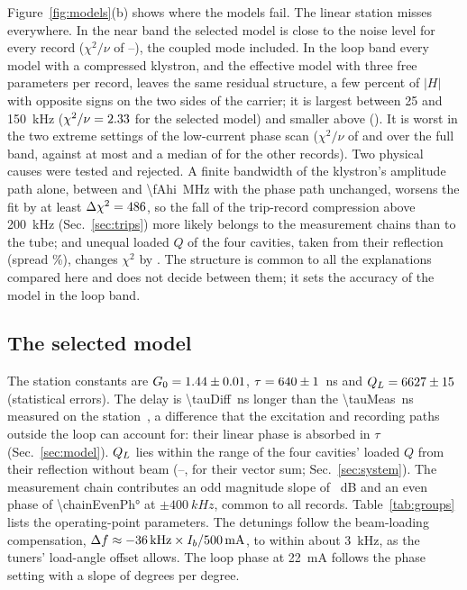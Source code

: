 Figure~\ref{fig:models}(b) shows where the models fail. The linear station misses everywhere. In the near band the selected model is close to the noise level for every record ($\chi^2/\nu$ of \chiRecNearLo--\chiRecNearHi), the coupled mode included. In the loop band every model with a compressed klystron, and the effective model with three free parameters per record, leaves the same residual structure, a few percent of $|H|$ with opposite signs on the two sides of the carrier; it is largest between 25 and \SI{150}{kHz} ($\chi^2/\nu=2.33$ for the selected model) and smaller above (\chiSelLoopHigh). It is worst in the two extreme settings of the low-current phase scan ($\chi^2/\nu$ of \chiRecLowLo{} and \chiRecLowHi{} over the full band, against at most \chiRecOthersHi{} and a median of \chiRecOthersMedian{} for the other records). Two physical causes were tested and rejected. A finite bandwidth of the klystron's amplitude path alone, between \fAlo{} and \SI{\fAhi}{MHz} with the phase path unchanged, worsens the fit by at least $\Delta\chi^2=486$, so the fall of the trip-record compression above \SI{200}{kHz} (Sec.~\ref{sec:trips}) more likely belongs to the measurement chains than to the tube; and unequal loaded $Q$ of the four cavities, taken from their reflection (spread \qSpread\%), changes $\chi^2$ by \dchiQrel. The structure is common to all the explanations compared here and does not decide between them; it sets the accuracy of the model in the loop band.

\subsection{The selected model}\label{sec:selected}

The station constants are $G_0=1.44\pm0.01$, $\tau=640\pm1$~ns and $Q_L=6627\pm15$ (statistical errors). The delay is \SI{\tauDiff}{ns} longer than the \SI{\tauMeas}{ns} measured on the station~\cite{Sebek2026}, a difference that the excitation and recording paths outside the loop can account for: their linear phase is absorbed in $\tau$ (Sec.~\ref{sec:model}). $Q_L$ lies within the range of the four cavities' loaded $Q$ from their reflection without beam (\QLreflLo--\QLreflHi, \QLrefl{} for their vector sum; Sec.~\ref{sec:system}). The measurement chain contributes an odd magnitude slope of \chainOdd~dB and an even phase of \ang{\chainEvenPh} at $\pm\SI{400}{kHz}$, common to all records. Table~\ref{tab:groups} lists the operating-point parameters. The detunings follow the beam-loading compensation, $\Delta f\approx-\SI{36}{kHz}\times I_b/\SI{500}{mA}$, to within about \SI{3}{kHz}, as the tuners' load-angle offset allows. The loop phase at \SI{22}{mA} follows the phase setting with a slope of \thetaSlopeLow{} degrees per degree.

